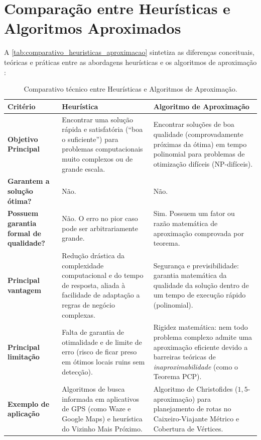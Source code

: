 \section{Comparação entre Heurísticas e Algoritmos Aproximados}

A \autoref{tab:comparativo_heuristicas_aproximacao} sintetiza as diferenças conceituais, teóricas e práticas entre as abordagens heurísticas e os algoritmos de aproximação \cite{fernandes2021, miyazawa_intro}:

\begin{table}[htb]
\centering
\caption{\label{tab:comparativo_heuristicas_aproximacao}Comparativo técnico entre Heurísticas e Algoritmos de Aproximação.}
\small
\renewcommand{\arraystretch}{1.4}
\begin{tabular}{|>{\raggedright\arraybackslash}p{3.0cm}|>{\raggedright\arraybackslash}p{5.5cm}|>{\raggedright\arraybackslash}p{5.5cm}|}
\hline
\rowcolor{gray!20}
\textbf{Critério} & \textbf{Heurística} & \textbf{Algoritmo de Aproximação} \\ \hline
\textbf{Objetivo Principal} & Encontrar uma solução rápida e satisfatória (``boa o suficiente'') para problemas computacionais muito complexos ou de grande escala. & Encontrar soluções de boa qualidade (comprovadamente próximas da ótima) em tempo polinomial para problemas de otimização difíceis (NP-difíceis). \\ \hline
\textbf{Garantem a solução ótima?} & Não. & Não. \\ \hline
\textbf{Possuem garantia formal de qualidade?} & Não. O erro no pior caso pode ser arbitrariamente grande. & Sim. Possuem um fator ou razão matemática de aproximação comprovada por teorema. \\ \hline
\textbf{Principal vantagem} & Redução drástica da complexidade computacional e do tempo de resposta, aliada à facilidade de adaptação a regras de negócio complexas. & Segurança e previsibilidade: garantia matemática da qualidade da solução dentro de um tempo de execução rápido (polinomial). \\ \hline
\textbf{Principal limitação} & Falta de garantia de otimalidade e de limite de erro (risco de ficar preso em ótimos locais ruins sem detecção). & Rigidez matemática: nem todo problema complexo admite uma aproximação eficiente devido a barreiras teóricas de \textit{inaproximabilidade} (como o Teorema PCP). \\ \hline
\textbf{Exemplo de aplicação} & Algoritmos de busca informada em aplicativos de GPS (como Waze e Google Maps) e heurística do Vizinho Mais Próximo. & Algoritmo de Christofides ($1,5$-aproximação) para planejamento de rotas no Caixeiro-Viajante Métrico e Cobertura de Vértices. \\ \hline
\end{tabular}
\end{table}

